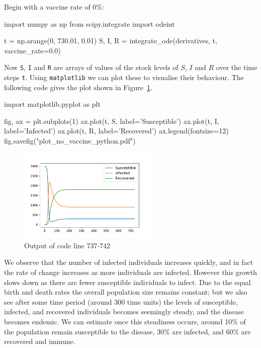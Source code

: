 Begin with a vaccine rate of 0\%:

\begin{pyin}
import numpy as np
from scipy.integrate import odeint

t = np.arange(0, 730.01, 0.01)
S, I, R = integrate_ode(derivatives, t, vaccine_rate=0.0)
\end{pyin}

Now \texttt{S}, \texttt{I} and \texttt{R}
are arrays of values of the stock levels of $S$, $I$ and $R$ over the time
steps \texttt{t}.
Using \texttt{matplotlib} we can plot these to visualise their
behaviour.
The following code gives the plot shown in Figure~\ref{fig:plot_no_vaccine}.


\begin{pyin-no-test}
import matplotlib.pyplot as plt

fig, ax = plt.subplots(1)
ax.plot(t, S, label='Susceptible')
ax.plot(t, I, label='Infected')
ax.plot(t, R, label='Recovered')
ax.legend(fontsize=12)
fig.savefig("plot_no_vaccine_python.pdf")
\end{pyin-no-test}


\begin{figure}
\begin{center}
\includegraphics[width=0.6\textwidth]{./assets/plot_no_vaccine_python.pdf}
\end{center}
\caption{Output of code line 737-742}
\label{fig:plot_no_vaccine}
\end{figure}

We observe that the number of infected individuals increases quickly, and in
fact the rate of change increases as more individuals are infected. However
this growth slows down as there are fewer susceptible individuals to infect. Due
to the equal birth and death rates the overall population size remains constant;
but we also see after some time period (around 300 time units) the levels of
susceptible, infected, and recovered individuals becomes seemingly steady, and
the disease becomes endemic. We can estimate once this steadiness occurs, around
10\% of the population remain susceptible to the disease, 30\% are infected, and
60\% are recovered and immune.

